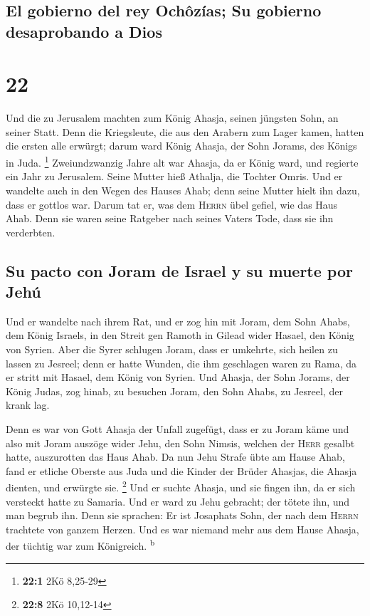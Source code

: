\hypertarget{el-gobierno-del-rey-ochuxf4zuxedas-su-gobierno-desaprobando-a-dios}{%
\subsection{El gobierno del rey Ochôzías; Su gobierno desaprobando a
Dios}\label{el-gobierno-del-rey-ochuxf4zuxedas-su-gobierno-desaprobando-a-dios}}

\hypertarget{section-21}{%
\section{22}\label{section-21}}

 Und die zu Jerusalem machten zum König Ahasja, seinen
jüngsten Sohn, an seiner Statt. Denn die Kriegsleute, die aus den
Arabern zum Lager kamen, hatten die ersten alle erwürgt; darum ward
König Ahasja, der Sohn Jorams, des Königs in Juda. \footnote{\textbf{22:1}
  2Kö 8,25-29}  Zweiundzwanzig Jahre alt war Ahasja, da er
König ward, und regierte ein Jahr zu Jerusalem. Seine Mutter hieß
Athalja, die Tochter Omris.  Und er wandelte auch in den
Wegen des Hauses Ahab; denn seine Mutter hielt ihn dazu, dass er gottlos
war.  Darum tat er, was dem \textsc{Herrn} übel gefiel,
wie das Haus Ahab. Denn sie waren seine Ratgeber nach seines Vaters
Tode, dass sie ihn verderbten.

\hypertarget{su-pacto-con-joram-de-israel-y-su-muerte-por-jehuxfa}{%
\subsection{Su pacto con Joram de Israel y su muerte por
Jehú}\label{su-pacto-con-joram-de-israel-y-su-muerte-por-jehuxfa}}

 Und er wandelte nach ihrem Rat, und er zog hin mit Joram,
dem Sohn Ahabs, dem König Israels, in den Streit gen Ramoth in Gilead
wider Hasael, den König von Syrien. Aber die Syrer schlugen Joram,
 dass er umkehrte, sich heilen zu lassen zu Jesreel; denn
er hatte Wunden, die ihm geschlagen waren zu Rama, da er stritt mit
Hasael, dem König von Syrien. Und Ahasja, der Sohn Jorams, der König
Judas, zog hinab, zu besuchen Joram, den Sohn Ahabs, zu Jesreel, der
krank lag.

 Denn es war von Gott Ahasja der Unfall zugefügt, dass er
zu Joram käme und also mit Joram auszöge wider Jehu, den Sohn Nimsis,
welchen der \textsc{Herr} gesalbt hatte, auszurotten das Haus Ahab.
 Da nun Jehu Strafe übte am Hause Ahab, fand er etliche
Oberste aus Juda und die Kinder der Brüder Ahasjas, die Ahasja dienten,
und erwürgte sie. \footnote{\textbf{22:8} 2Kö 10,12-14} 
Und er suchte Ahasja, und sie fingen ihn, da er sich versteckt hatte zu
Samaria. Und er ward zu Jehu gebracht; der tötete ihn, und man begrub
ihn. Denn sie sprachen: Er ist Josaphats Sohn, der nach dem
\textsc{Herrn} trachtete von ganzem Herzen. Und es war niemand mehr aus
dem Hause Ahasja, der tüchtig war zum Königreich. \textsuperscript{b}

